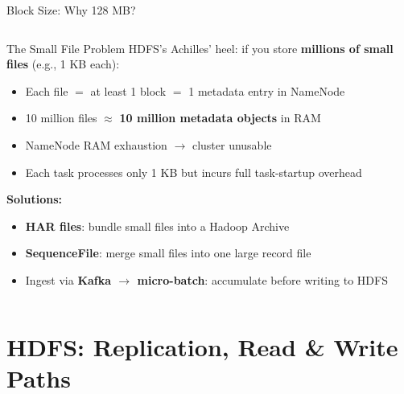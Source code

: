 \documentclass[aspectratio=169,10pt]{beamer}
\begin{document}
\begin{frame}{Block Size: Why 128 MB?}
\begin{columns}[T]
      \begin{alertblock}{The Small File Problem}
        HDFS's Achilles' heel: if you store \textbf{millions of small files} (e.g., 1 KB each):
        \vspace{4pt}
        \begin{itemize}
          \item Each file $=$ at least 1 block $=$ 1 metadata entry in NameNode
          \item 10 million files $\approx$ \textbf{10 million metadata objects} in RAM
          \item NameNode RAM exhaustion $\to$ cluster unusable
          \item Each task processes only 1 KB but incurs full task-startup overhead
        \end{itemize}
        \vspace{4pt}
        \textbf{Solutions:}
        \begin{itemize}
          \small
          \item \textbf{HAR files}: bundle small files into a Hadoop Archive
          \item \textbf{SequenceFile}: merge small files into one large record file
          \item Ingest via \textbf{Kafka $\to$ micro-batch}: accumulate before writing to HDFS
        \end{itemize}
      \end{alertblock}
  \end{columns}
\end{frame}

\section{HDFS: Replication, Read \& Write Paths}
\end{document}
